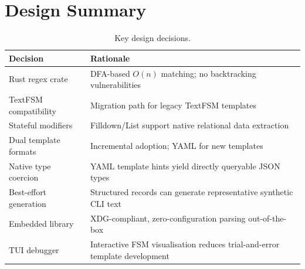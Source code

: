 \documentclass[a4paper,10pt]{article}
\begin{document}
\section{Design Summary}
\label{sec:summary}

\begin{table}[H]
\centering
\caption{Key design decisions.}
\label{tab:decisions}
\begin{tabularx}{\linewidth}{lX}
  \toprule
  \textbf{Decision} & \textbf{Rationale} \\
  \midrule
  Rust regex crate & DFA-based $O(n)$ matching; no backtracking vulnerabilities \\
  TextFSM compatibility & Migration path for legacy TextFSM templates \\
  Stateful modifiers & Filldown/List support native relational data extraction \\
  Dual template formats & Incremental adoption; YAML for new templates \\
  Native type coercion & YAML template hints yield directly queryable JSON types \\
  Best-effort generation & Structured records can generate representative synthetic CLI text \\
  Embedded library & XDG-compliant, zero-configuration parsing out-of-the-box \\
  TUI debugger & Interactive FSM visualisation reduces trial-and-error template development \\
  \bottomrule
\end{tabularx}
\end{table}

\printbibliography

\clearpage


\printindex

\printrevisionhistory
\printtodolist
\end{document}
